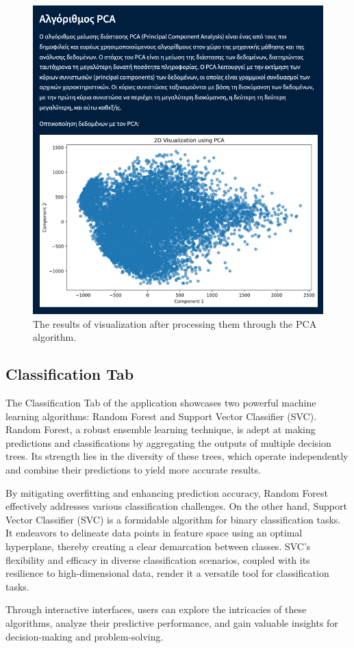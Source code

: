 \documentclass[unnumsec,webpdf,contemporary,large]{oup-authoring-template}%
\theoremstyle{thmstyleone}%
\theoremstyle{thmstyletwo}%
\theoremstyle{thmstylethree}%
\begin{document}
\begin{figure}
    \centering
    \includegraphics[width=0.4\linewidth]{images/pca.png}
    \caption{The results of visualization after processing them through the PCA algorithm.}
    \label{fig:pca}
\end{figure}

\subsection{\textbf{Classification Tab}}
\vspace{0.2cm}


The Classification Tab of the application showcases two powerful machine learning algorithms: Random Forest and Support Vector Classifier (SVC). Random Forest, a robust ensemble learning technique, is adept at making predictions and classifications by aggregating the outputs of multiple decision trees. Its strength lies in the diversity of these trees, which operate independently and combine their predictions to yield more accurate results. 
\vspace{0.2cm}

By mitigating overfitting and enhancing prediction accuracy, Random Forest effectively addresses various classification challenges. On the other hand, Support Vector Classifier (SVC) is a formidable algorithm for binary classification tasks. It endeavors to delineate data points in feature space using an optimal hyperplane, thereby creating a clear demarcation between classes. SVC's flexibility and efficacy in diverse classification scenarios, coupled with its resilience to high-dimensional data, render it a versatile tool for classification tasks. 
\vspace{0.2cm}

Through interactive interfaces, users can explore the intricacies of these algorithms, analyze their predictive performance, and gain valuable insights for decision-making and problem-solving.
\vspace{0.2cm}
\end{document}
